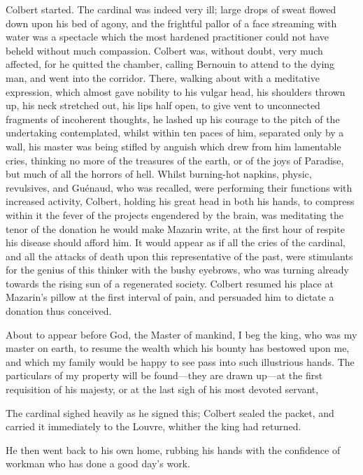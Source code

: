 Colbert started. The cardinal was indeed very ill; large drops of sweat flowed down upon his bed of agony, and the frightful pallor of a face streaming with water was a spectacle which the most hardened practitioner could not have beheld without much compassion. Colbert was, without doubt, very much affected, for he quitted the chamber, calling Bernouin to attend to the dying man, and went into the corridor. There, walking about with a meditative expression, which almost gave nobility to his vulgar head, his shoulders thrown up, his neck stretched out, his lips half open, to give vent to unconnected fragments of incoherent thoughts, he lashed up his courage to the pitch of the undertaking contemplated, whilst within ten paces of him, separated only by a wall, his master was being stifled by anguish which drew from him lamentable cries, thinking no more of the treasures of the earth, or of the joys of Paradise, but much of all the horrors of hell. Whilst burning-hot napkins, physic, revulsives, and Guénaud, who was recalled, were performing their functions with increased activity, Colbert, holding his great head in both his hands, to compress within it the fever of the projects engendered by the brain, was meditating the tenor of the donation he would make Mazarin write, at the first hour of respite his disease should afford him. It would appear as if all the cries of the cardinal, and all the attacks of death upon this representative of the past, were stimulants for the genius of this thinker with the bushy eyebrows, who was turning already towards the rising sun of a regenerated society. Colbert resumed his place at Mazarin's pillow at the first interval of pain, and persuaded him to dictate a donation thus conceived.

\begin{mail}{}{}
About to appear before God, the Master of mankind, I beg the king, who was my master on earth, to resume the wealth which his bounty has bestowed upon me, and which my family would be happy to see pass into such illustrious hands. The particulars of my property will be found—they are drawn up—at the first requisition of his majesty, or at the last sigh of his most devoted servant,
\end{mail}


The cardinal sighed heavily as he signed this; Colbert sealed the packet, and carried it immediately to the Louvre, whither the king had returned.

He then went back to his own home, rubbing his hands with the confidence of workman who has done a good day's work. 